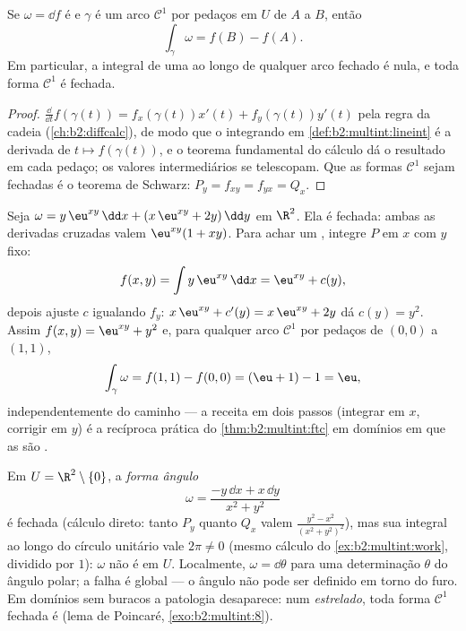 \begin{theorem}\label{thm:b2:multint:ftc}
Se $\omega = \dd f$ é  e $\gamma$ é um arco $\mathcal{C}^1$
por pedaços em $U$ de $A$ a $B$, então
\[
\int_\gamma \omega = f(B) - f(A) .
\]
Em particular, a integral de uma  ao longo de qualquer arco fechado
é nula, e toda forma $\mathcal{C}^1$  é fechada.
\end{theorem}

\begin{proof}
$\frac{\dd}{\dd t}f(\gamma(t)) = f_x(\gamma(t))x'(t) +
f_y(\gamma(t))y'(t)$ pela regra da cadeia
(\cref{ch:b2:diffcalc}), de modo que o integrando em
\cref{def:b2:multint:lineint} é a derivada de $t \mapsto
f(\gamma(t))$, e o teorema fundamental do cálculo dá o
resultado em cada pedaço; os valores intermediários se telescopam. Que as
formas $\mathcal{C}^1$  sejam fechadas é o teorema de Schwarz: $P_y =
f_{xy} = f_{yx} = Q_x$.
\end{proof}

\begin{example}\label{ex:b2:multint:potential}
Seja $\omega = y\,\eu^{xy}\,\dd x + (x\,\eu^{xy} + 2y)\,\dd y$
em $\R^2$. Ela é fechada: ambas as derivadas cruzadas valem
$\eu^{xy}(1 + xy)$. Para achar um , integre $P$ em
$x$ com $y$ fixo:
\[
f(x, y) = \int y\,\eu^{xy}\,\dd x = \eu^{xy} + c(y),
\]
depois ajuste $c$ igualando $f_y$: $x\,\eu^{xy} + c'(y) =
x\,\eu^{xy} + 2y$ dá $c(y) = y^2$. Assim $f(x,y) = \eu^{xy} +
y^2$ e, para qualquer arco $\mathcal C^1$ por pedaços de $(0,0)$
a $(1,1)$,
\[
\int_\gamma\omega = f(1,1) - f(0,0) = (\eu + 1) - 1 = \eu ,
\]
independentemente do caminho --- a receita em dois passos (integrar
em $x$, corrigir em $y$) é a recíproca prática do
\cref{thm:b2:multint:ftc} em domínios em que as  são
.
\end{example}

\begin{example}\label{ex:b2:multint:angleform}
Em $U = \R^2 \setminus \{0\}$, a \emph{forma ângulo}
\[
\omega = \frac{-y\,\dd x + x\,\dd y}{x^2 + y^2}
\]
é fechada (cálculo direto: tanto $P_y$ quanto $Q_x$ valem
$\frac{y^2 - x^2}{(x^2+y^2)^2}$), mas sua integral ao longo do círculo
unitário vale $2\pi \neq 0$ (mesmo cálculo do
\cref{ex:b2:multint:work}, dividido por $1$): $\omega$ não é 
em $U$. Localmente, $\omega = \dd\theta$ para uma determinação
$\theta$ do ângulo polar; a falha é global --- o ângulo
não pode ser definido  em torno do furo. Em domínios
sem buracos a patologia desaparece: num  \emph{estrelado},
toda forma $\mathcal{C}^1$ fechada é 
(lema de Poincaré, \cref{exo:b2:multint:8}).
\end{example}

